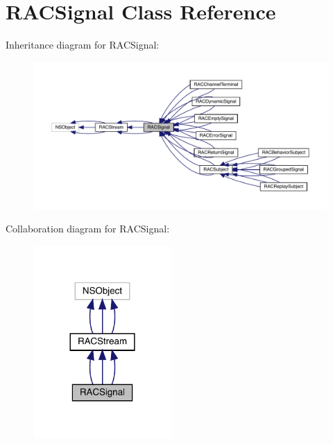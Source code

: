 \hypertarget{interface_r_a_c_signal}{}\section{R\+A\+C\+Signal Class Reference}
\label{interface_r_a_c_signal}


Inheritance diagram for R\+A\+C\+Signal\+:\nopagebreak
\begin{figure}[H]
\begin{center}
\leavevmode
\includegraphics[width=350pt]{interface_r_a_c_signal__inherit__graph}
\end{center}
\end{figure}


Collaboration diagram for R\+A\+C\+Signal\+:\nopagebreak
\begin{figure}[H]
\begin{center}
\leavevmode
\includegraphics[width=149pt]{interface_r_a_c_signal__coll__graph}
\end{center}
\end{figure}
